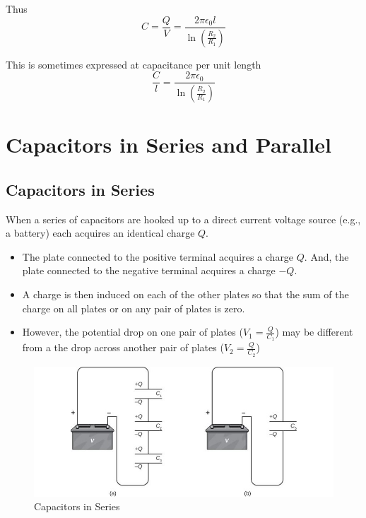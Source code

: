 \documentclass[14pt]{memoir}
\begin{document}
Thus
\begin{equation}
C = \frac{Q}{V} = \frac{2 \pi \epsilon_0 l}{\ln{(\frac{R_2}{R_1})}}
\end{equation}

This is sometimes expressed at capacitance per unit length 
\begin{equation}
\frac{C}{l} = \frac{2 \pi \epsilon_0 }{\ln{(\frac{R_2}{R_1})}}
\end{equation}

\section{Capacitors in Series and Parallel}  

\subsection{Capacitors in Series}

When a series of capacitors are hooked up to a direct current voltage source (e.g., a battery) each acquires an identical charge $Q$. 

\begin{itemize}
\item The plate connected to the positive terminal acquires a charge $Q$. And, the plate connected to the negative terminal acquires a charge $-Q$. 
\item A charge is then induced on each of the other plates so that the sum of the charge on all plates or on any pair of plates is zero.
\item However, the potential drop on one pair of plates ($V_1=\frac{Q}{C_1}$) may be different from a the drop across another pair of plates ($V_2=\frac{Q}{C_2}$)
\end{itemize}

\begin{figure}[H]
\begin{center}
\includegraphics[scale=0.45]{fig/fig_08_11.jpg}
\caption{Capacitors in Series}
\label{fig:08_11}
\end{center}
\end{figure}
\end{document}
